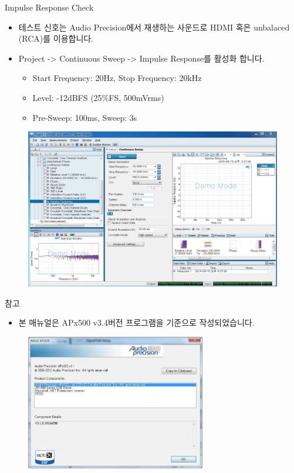\documentclass{beamer}
\begin{document}
\begin{frame}[t]{Impulse Response Check}
\begin{itemize}
\item 테스트 신호는 Audio Precision에서 재생하는 사운드로 HDMI 혹은 unbalaced (RCA)를 이용합니다.
\item Project -> Continuous Sweep -> Impulse Response를 활성화 합니다.
	\begin{itemize}
	\item Start Frequency: 20Hz, Stop Frequency: 20kHz
	\item Level: -12dBFS (25\%FS, 500mVrms)
	\item Pre-Sweep: 100ms, Sweep: 3s
	\end{itemize}
\end{itemize}

\begin{figure}[r]
\includegraphics[height=0.4\textwidth]{figure/apsetting/impulseResponse.png}
\end{figure}

\end{frame}


\begin{frame}[t]{참고}
	\begin{itemize}
	\item 본 매뉴얼은 APx500 v3.4버전 프로그램을 기준으로 작성되었습니다.
	\end{itemize}

	\begin{figure}
		\begin{center}
		\includegraphics[width=0.7\textwidth]{figure/ap/about_apx500.jpg}
		\end{center}
	\end{figure}
\end{frame}
\end{document}
